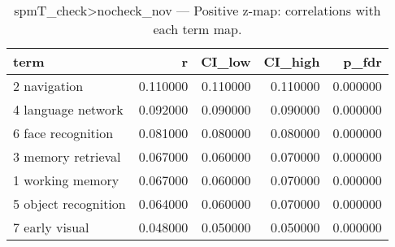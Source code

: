 \begin{table}
\caption{spmT_check>nocheck_nov — Positive z-map: correlations with each term map.}
\label{tab:spmT_check>nocheck_nov_pos}
\begin{tabular}{lrrrr}
\toprule
term & r & CI\_low & CI\_high & p\_fdr \\
\midrule
2 navigation & 0.110000 & 0.110000 & 0.110000 & 0.000000 \\
4 language network & 0.092000 & 0.090000 & 0.090000 & 0.000000 \\
6 face recognition & 0.081000 & 0.080000 & 0.080000 & 0.000000 \\
3 memory retrieval & 0.067000 & 0.060000 & 0.070000 & 0.000000 \\
1 working memory & 0.067000 & 0.060000 & 0.070000 & 0.000000 \\
5 object recognition & 0.064000 & 0.060000 & 0.070000 & 0.000000 \\
7 early visual & 0.048000 & 0.050000 & 0.050000 & 0.000000 \\
\bottomrule
\end{tabular}
\end{table}
